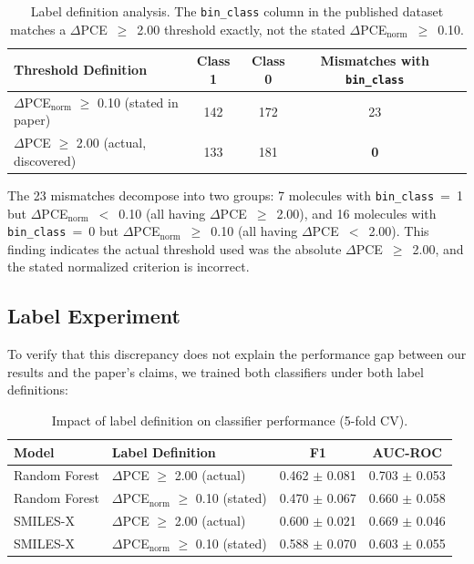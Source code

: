 \documentclass[11pt,a4paper]{article}
\begin{document}
\begin{table}[H]
\centering
\caption{Label definition analysis. The \texttt{bin\_class} column in the published dataset matches a $\Delta$PCE~$\geq$~2.00 threshold exactly, not the stated $\Delta$PCE$_\text{norm}$~$\geq$~0.10.}
\label{tab:labels}
\begin{tabular}{lcccc}
\toprule
Threshold Definition & Class 1 & Class 0 & Mismatches with \texttt{bin\_class} \\
\midrule
$\Delta$PCE$_\text{norm}$ $\geq$ 0.10 (stated in paper) & 142 & 172 & 23 \\
\rowcolor{lightgreen}
$\Delta$PCE $\geq$ 2.00 (actual, discovered) & 133 & 181 & \textbf{0} \\
\bottomrule
\end{tabular}
\end{table}

The 23 mismatches decompose into two groups: 7 molecules with \texttt{bin\_class}~=~1 but $\Delta$PCE$_\text{norm}$~$<$~0.10 (all having $\Delta$PCE~$\geq$~2.00), and 16 molecules with \texttt{bin\_class}~=~0 but $\Delta$PCE$_\text{norm}$~$\geq$~0.10 (all having $\Delta$PCE~$<$~2.00). This finding indicates the actual threshold used was the absolute $\Delta$PCE~$\geq$~2.00, and the stated normalized criterion is incorrect.

\subsection{Label Experiment}
\label{sec:label_experiment}

To verify that this discrepancy does not explain the performance gap between our results and the paper's claims, we trained both classifiers under both label definitions:

\begin{table}[H]
\centering
\caption{Impact of label definition on classifier performance (5-fold CV).}
\label{tab:label_exp}
\begin{tabular}{llcc}
\toprule
Model & Label Definition & F1 & AUC-ROC \\
\midrule
Random Forest & $\Delta$PCE $\geq$ 2.00 (actual) & 0.462 $\pm$ 0.081 & 0.703 $\pm$ 0.053 \\
Random Forest & $\Delta$PCE$_\text{norm}$ $\geq$ 0.10 (stated) & 0.470 $\pm$ 0.067 & 0.660 $\pm$ 0.058 \\
SMILES-X & $\Delta$PCE $\geq$ 2.00 (actual) & 0.600 $\pm$ 0.021 & 0.669 $\pm$ 0.046 \\
SMILES-X & $\Delta$PCE$_\text{norm}$ $\geq$ 0.10 (stated) & 0.588 $\pm$ 0.070 & 0.603 $\pm$ 0.055 \\
\bottomrule
\end{tabular}
\end{table}
\end{document}
